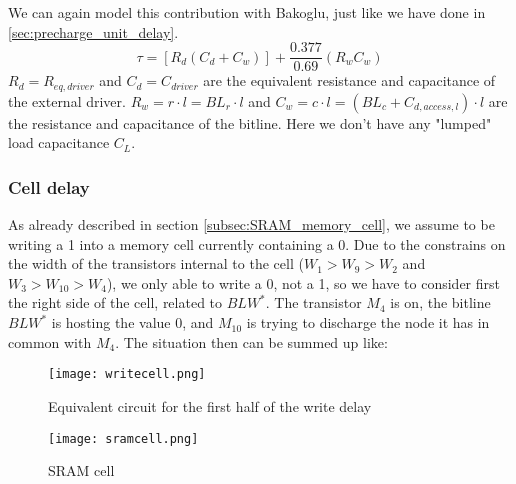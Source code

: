 We can again model this contribution with Bakoglu, just like we have done in \ref{sec:precharge_unit_delay}.
$$\tau=[R_d(C_d+C_w)]+\frac{0.377}{0.69}(R_wC_w)$$
$R_d=R_{eq,driver}$ and $C_d=C_{driver}$ are the equivalent resistance and capacitance of the external driver. $R_w=r\cdot l=BL_{r}\cdot l$ and $C_w=c\cdot l=(BL_{c}+C_{d,access,l})\cdot l$ are the resistance and capacitance of the bitline. Here we don't have any "lumped" load capacitance $C_L$. 

\subsubsection{Cell delay}
As already described in section \ref{subsec:SRAM_memory_cell}, we assume to be writing a 1 into a memory cell currently containing a 0. Due to the constrains on the width of the transistors internal to the cell ($W_1>W_9>W_2$ and $W_3>W_{10}>W_4$), we only able to write a 0, not a 1, so we have to consider first the right side of the cell, related to $BLW^*$. The transistor $M_4$ is on, the bitline $BLW^*$ is hosting the value 0, and $M_{10}$ is trying to discharge the node it has in common with $M_4$. The situation then can be summed up like:

\begin{minipage}{\linewidth}
\centering
	\begin{minipage}{0.3\linewidth}
		\begin{figure}[H]
			\begin{center}
				\texttt{[image: writecell.png]}
			\end{center}
				\caption{Equivalent circuit for the first half of the write delay} 
		\end{figure}
	\end{minipage}
	\hspace{0.05\linewidth}
	\begin{minipage}{0.6\linewidth}
		\begin{figure}[H]
			\begin{center}
				\texttt{[image: sramcell.png]}
			\end{center}
				\caption{SRAM cell}
		\end{figure}
	\end{minipage}
\end{minipage}\\

